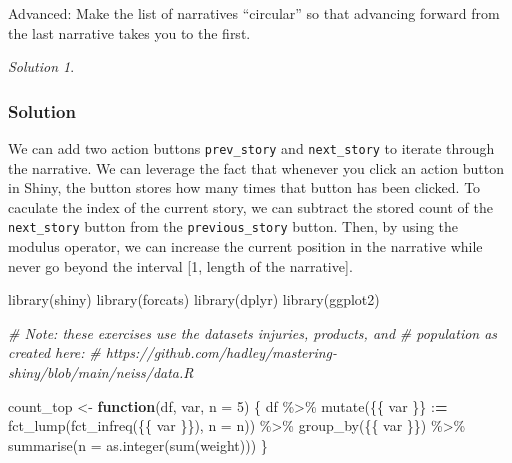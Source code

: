 \documentclass[
]{book}
\newenvironment{Shaded}{\begin{snugshade}}{\end{snugshade}}
\newcommand{\AttributeTok}[1]{\textcolor[rgb]{0.77,0.63,0.00}{#1}}
\newcommand{\CommentTok}[1]{\textcolor[rgb]{0.56,0.35,0.01}{\textit{#1}}}
\newcommand{\ControlFlowTok}[1]{\textcolor[rgb]{0.13,0.29,0.53}{\textbf{#1}}}
\newcommand{\DecValTok}[1]{\textcolor[rgb]{0.00,0.00,0.81}{#1}}
\newcommand{\ErrorTok}[1]{\textcolor[rgb]{0.64,0.00,0.00}{\textbf{#1}}}
\newcommand{\FunctionTok}[1]{\textcolor[rgb]{0.00,0.00,0.00}{#1}}
\newcommand{\NormalTok}[1]{#1}
\newcommand{\OtherTok}[1]{\textcolor[rgb]{0.56,0.35,0.01}{#1}}
\newcommand{\SpecialCharTok}[1]{\textcolor[rgb]{0.00,0.00,0.00}{#1}}
\theoremstyle{definition}
\theoremstyle{definition}
\theoremstyle{definition}
\theoremstyle{definition}
\theoremstyle{remark}
\newtheorem*{solution}{Solution}
\begin{document}
Advanced: Make the list of narratives ``circular'' so that advancing forward from
the last narrative takes you to the first.

\begin{solution}
\leavevmode

\hypertarget{solution-21}{%
\subsubsection*{Solution}\label{solution-21}}

We can add two action buttons \texttt{prev\_story} and \texttt{next\_story} to iterate through the
narrative. We can leverage the fact that whenever you click an action button in Shiny, the button stores how many times that button has been clicked. To caculate the index of the current story, we can subtract the stored count of the \texttt{next\_story} button from the \texttt{previous\_story} button. Then, by using the modulus operator, we can increase the current position in the narrative while never go beyond the interval {[}1, length of the narrative{]}.

\begin{Shaded}
\begin{Highlighting}[]
\FunctionTok{library}\NormalTok{(shiny)}
\FunctionTok{library}\NormalTok{(forcats)}
\FunctionTok{library}\NormalTok{(dplyr)}
\FunctionTok{library}\NormalTok{(ggplot2)}

\CommentTok{\# Note: these exercises use the datasets \textasciigrave{}injuries\textasciigrave{}, \textasciigrave{}products\textasciigrave{}, and}
\CommentTok{\# \textasciigrave{}population\textasciigrave{} as created here:}
\CommentTok{\# https://github.com/hadley/mastering{-}shiny/blob/main/neiss/data.R}

\NormalTok{count\_top }\OtherTok{\textless{}{-}} \ControlFlowTok{function}\NormalTok{(df, var, }\AttributeTok{n =} \DecValTok{5}\NormalTok{) \{}
\NormalTok{  df }\SpecialCharTok{\%\textgreater{}\%}
    \FunctionTok{mutate}\NormalTok{(\{\{ var \}\} }\SpecialCharTok{:}\ErrorTok{=} \FunctionTok{fct\_lump}\NormalTok{(}\FunctionTok{fct\_infreq}\NormalTok{(\{\{ var \}\}), }\AttributeTok{n =}\NormalTok{ n)) }\SpecialCharTok{\%\textgreater{}\%}
    \FunctionTok{group\_by}\NormalTok{(\{\{ var \}\}) }\SpecialCharTok{\%\textgreater{}\%}
    \FunctionTok{summarise}\NormalTok{(}\AttributeTok{n =} \FunctionTok{as.integer}\NormalTok{(}\FunctionTok{sum}\NormalTok{(weight)))}
\NormalTok{\}}


\end{Highlighting}
\end{Shaded}
\end{solution}
\end{document}

